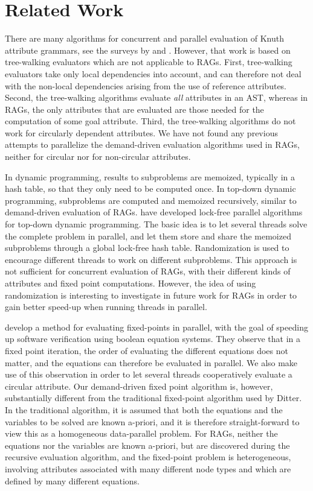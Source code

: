 {\section{Related Work}
\label{related-work}

There are many algorithms for concurrent and parallel evaluation of Knuth attribute grammars, see
the surveys by \textcite{DBLP:conf/saga/Jourdan91} and \textcite{DBLP:journals/csur/Paakki95}. However, that work is based on tree-walking evaluators which are not applicable to RAGs. First, tree-walking evaluators take only local dependencies into account, and can therefore not deal with the non-local dependencies arising from the use of reference attributes.
Second, the tree-walking algorithms evaluate \emph{all} attributes in an AST, whereas in RAGs,
the only attributes that are evaluated are those needed for the computation of some goal attribute.
Third, the tree-walking algorithms do not work for circularly dependent attributes.
We have not found any previous attempts to parallelize the demand-driven evaluation algorithms used in RAGs, neither for circular nor for non-circular attributes.

In dynamic programming, results to subproblems are memoized, typically in a hash table, so that they
only need to be computed once. In top-down dynamic programming, subproblems are computed and
memoized recursively, similar to demand-driven evaluation of RAGs.
\textcite{DBLP:journals/jpdc/StivalaSBHW10} have developed lock-free parallel algorithms for top-down
dynamic programming. The basic idea is to let several threads solve the complete problem in
parallel, and let them store and share the memoized subproblems through a global lock-free hash
table. Randomization is used to encourage different threads to work on different subproblems. This
approach is not sufficient for concurrent evaluation of RAGs, with their different kinds of
attributes and fixed point computations. However, the idea of using randomization is interesting to
investigate in future work for RAGs in order to gain better speed-up when running threads in
parallel.

\textcite{DBLP:conf/spin/DitterCL12} develop a method for evaluating fixed-points in parallel, with the
goal of speeding up software verification using boolean equation systems. They observe that in a
fixed point iteration, the order of evaluating the different equations does not matter, and the
equations can therefore be evaluated in parallel. We also make use of this observation in order to
let several threads cooperatively evaluate a circular attribute. Our demand-driven fixed point
algorithm is, however, substantially different from the traditional fixed-point algorithm used by
Ditter. In the traditional algorithm, it is assumed that both the equations and the variables to be
solved are known a-priori, and it is therefore straight-forward to view this as a homogeneous
data-parallel problem. For RAGs, neither the equations nor the variables are known a-priori, but are
discovered during the recursive evaluation algorithm, and the fixed-point problem is heterogeneous,
involving attributes associated with many different node types and which are defined by many different equations.

}
